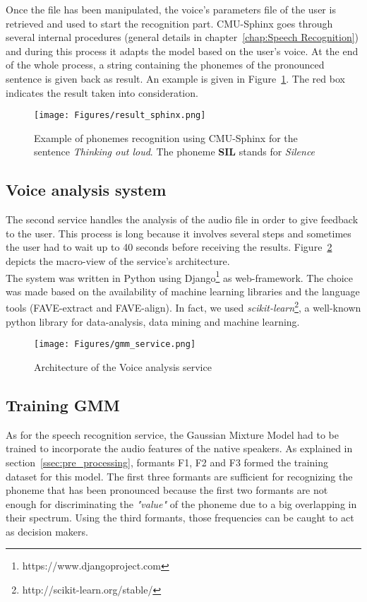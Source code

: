 \noindent Once the file has been manipulated, the voice's parameters file of the user is retrieved and used to start the recognition part. CMU-Sphinx goes through several internal procedures (general details in chapter~\ref{chap:Speech Recognition}) and during this process it adapts the model based on the user's voice. At the end of the whole process, a string containing the phonemes of the pronounced sentence is given back as result. An example is given in Figure~\ref{fig:result_sphinx}. The red box indicates the result taken into consideration.

\begin{figure}[!ht]
	\centering
	\texttt{[image: Figures/result\_sphinx.png]}
	\caption{Example of phonemes recognition using CMU-Sphinx for the sentence \textit{Thinking out loud}. The phoneme \textbf{SIL} stands for \textit{Silence}}
	\label{fig:result_sphinx}
\end{figure}

\subsection{Voice analysis system}
\label{ssec:training_gmm}

The second service handles the analysis of the audio file in order to give feedback to the user. This process is long because it involves several steps and sometimes the user had to wait up to 40 seconds before receiving the results. Figure~\ref{fig:gmm_service} depicts the macro-view of the service's architecture. \\
\noindent The system was written in Python using Django\footnote{https://www.djangoproject.com} as web-framework. The choice was made based on the availability of machine learning libraries and the language tools (FAVE-extract and FAVE-align). In fact, we used \textit{scikit-learn}\footnote{http://scikit-learn.org/stable/}, a well-known python library for data-analysis, data mining and machine learning. \\

\begin{figure}[!ht]
	\centering
	\texttt{[image: Figures/gmm\_service.png]}
	\caption{Architecture of the Voice analysis service}
	\label{fig:gmm_service}
\end{figure}

\subsection{Training GMM}
\noindent As for the speech recognition service, the Gaussian Mixture Model had to be trained to incorporate the audio features of the native speakers. As explained in section~\ref{ssec:pre_processing}, formants F1, F2 and F3 formed the training dataset for this model. The first three formants are sufficient for recognizing the phoneme that has been pronounced because the first two formants are not enough for discriminating the \textit{"value"} of the phoneme due to a big overlapping in their spectrum. Using the third formants, those frequencies can be caught to act as decision makers\cite{prica2010recognition}. \\


